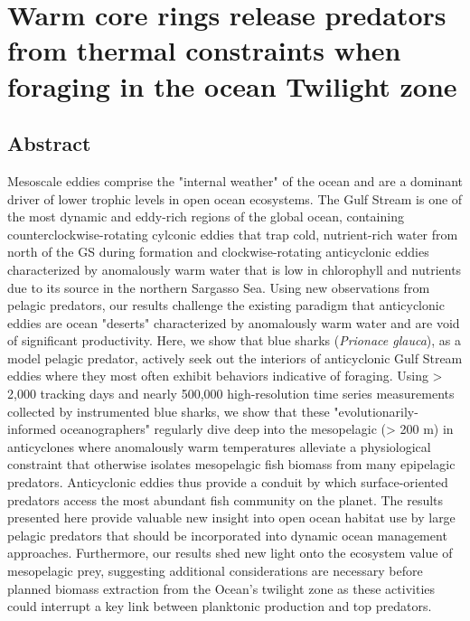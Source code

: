 

\chapter{Warm core rings release predators from thermal constraints when foraging in the ocean Twilight zone}
\label{chap:5}
\raggedbottom

{\let\thefootnote\relax{}}
{\let\thefootnote\relax{}}


\clearpage

\section{Abstract} 

Mesoscale eddies comprise the "internal weather" of the ocean and are a dominant driver of lower trophic levels in open ocean ecosystems. The Gulf Stream is one of the most dynamic and eddy-rich regions of the global ocean, containing counterclockwise-rotating cylconic eddies that trap cold, nutrient-rich water from north of the GS during formation and clockwise-rotating anticyclonic eddies characterized by anomalously warm water that is low in chlorophyll and nutrients due to its source in the northern Sargasso Sea. Using new observations from pelagic predators, our results challenge the existing paradigm that anticyclonic eddies are ocean "deserts" characterized by anomalously warm water and are void of significant productivity. Here, we show that blue sharks (\textit{Prionace glauca}), as a model pelagic predator, actively seek out the interiors of anticyclonic Gulf Stream eddies where they most often exhibit behaviors indicative of foraging. Using > 2,000 tracking days and nearly 500,000 high-resolution time series measurements collected by instrumented blue sharks, we show that these "evolutionarily-informed oceanographers" regularly dive deep into the mesopelagic (> 200 m) in anticyclones where anomalously warm temperatures alleviate a physiological constraint that otherwise isolates mesopelagic fish biomass from many epipelagic predators. Anticyclonic eddies thus provide a conduit by which surface-oriented predators access the most abundant fish community on the planet. The results presented here provide valuable new insight into open ocean habitat use by large pelagic predators that should be incorporated into dynamic ocean management approaches. Furthermore, our results shed new light onto the ecosystem value of mesopelagic prey, suggesting additional considerations are necessary before planned biomass extraction from the Ocean's twilight zone as these activities could interrupt a key link between planktonic production and top predators.

